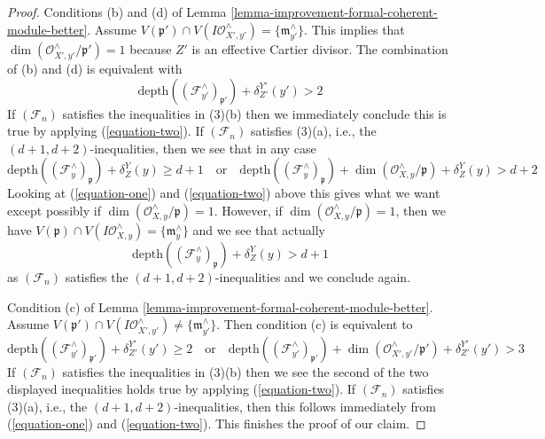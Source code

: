 \documentclass{stacks-project}
\theoremstyle{plain}
\theoremstyle{definition}
\theoremstyle{remark}
\numberwithin{equation}{subsection}
\begin{document}
\begin{proof}
\medskip\noindent
Conditions (b) and (d) of
Lemma \ref{lemma-improvement-formal-coherent-module-better}. Assume
$V(\mathfrak p') \cap V(I\mathcal{O}_{X', y'}^\wedge) =
\{\mathfrak m_{y'}^\wedge\}$.
This implies that $\dim(\mathcal{O}_{X', y'}^\wedge/\mathfrak p') = 1$
because $Z'$ is an effective Cartier divisor.
The combination of (b) and (d) is equivalent with
$$
\text{depth}((\mathcal{F}_{y'}^\wedge)_{\mathfrak p'}) + \delta^{Y'}_{Z'}(y')
> 2
$$
If $(\mathcal{F}_n)$ satisfies the inequalities in (3)(b)
then we immediately conclude this is true by applying (\ref{equation-two}).
If $(\mathcal{F}_n)$ satisfies (3)(a), i.e., the
$(d + 1, d + 2)$-inequalities, then we see that in any case
$$
\text{depth}((\mathcal{F}_y^\wedge)_{\mathfrak p}) + \delta^Y_Z(y)
\geq d + 1
\quad\text{or}\quad
\text{depth}((\mathcal{F}_y^\wedge)_{\mathfrak p}) +
\dim(\mathcal{O}_{X, y}^\wedge/\mathfrak p) +
\delta^Y_Z(y) > d + 2
$$
Looking at (\ref{equation-one}) and (\ref{equation-two}) above this gives
what we want except possibly if
$\dim(\mathcal{O}_{X, y}^\wedge/\mathfrak p) = 1$.
However, if $\dim(\mathcal{O}_{X, y}^\wedge/\mathfrak p) = 1$, then we have
$V(\mathfrak p) \cap V(I\mathcal{O}_{X, y}^\wedge) = \{\mathfrak m_y^\wedge\}$
and we see that actually
$$
\text{depth}((\mathcal{F}_y^\wedge)_{\mathfrak p}) + \delta^Y_Z(y) > d + 1
$$
as $(\mathcal{F}_n)$ satisfies the $(d + 1, d + 2)$-inequalities and we
conclude again.

\medskip\noindent
Condition (c) of
Lemma \ref{lemma-improvement-formal-coherent-module-better}. Assume
$V(\mathfrak p') \cap V(I\mathcal{O}_{X', y'}^\wedge) \not =
\{\mathfrak m_{y'}^\wedge\}$. Then condition (c) is equivalent to
$$
\text{depth}((\mathcal{F}_{y'}^\wedge)_{\mathfrak p'}) + \delta^{Y'}_{Z'}(y')
\geq 2
\quad\text{or}\quad
\text{depth}((\mathcal{F}_{y'}^\wedge)_{\mathfrak p'}) +
\dim(\mathcal{O}_{X', y'}^\wedge/\mathfrak p') +
\delta^{Y'}_{Z'}(y') > 3
$$
If $(\mathcal{F}_n)$ satisfies the inequalities in (3)(b)
then we see the second of the two displayed inequalities holds true
by applying (\ref{equation-two}). If $(\mathcal{F}_n)$ satisfies (3)(a), i.e.,
the $(d + 1, d + 2)$-inequalities, then this follows immediately from
(\ref{equation-one}) and (\ref{equation-two}).
This finishes the proof of our claim.


\end{proof}
\end{document}
